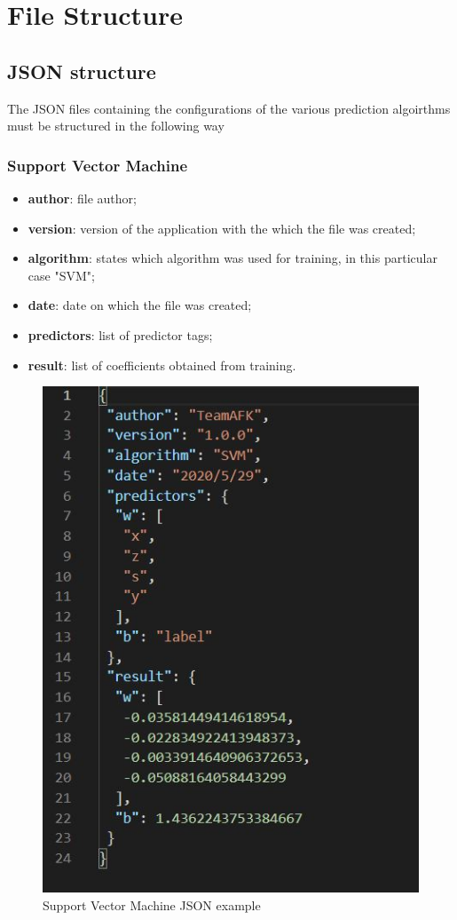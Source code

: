 \section{File Structure}
\subsection{JSON structure}
The JSON files containing the configurations of the various prediction algoirthms must be structured in the following way

\subsubsection{Support Vector Machine}
\begin{itemize}
	\item \textbf{author}: file author;
	\item \textbf{version}: version of the application with the which the file was created;
	\item \textbf{algorithm}: states which algorithm was used for training, in this particular case "SVM";
	\item \textbf{date}: date on which the file was created;
	\item \textbf{predictors}: list of predictor tags;
	\item \textbf{result}: list of coefficients obtained from training.
\end{itemize}
\begin{figure}[H]
\centering
\includegraphics[scale=0.65]{img/json/jsonSVM.jpg}
\caption{Support Vector Machine JSON example}
\end{figure}
\newpage


